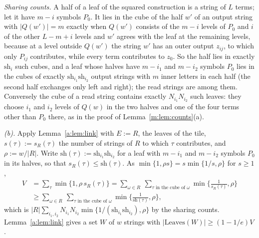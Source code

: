\documentclass[11pt]{article}
\theoremstyle{definition}
\theoremstyle{remark}
\newcommand{\Leaves}{\mathrm{Leaves}}
\begin{document}
\emph{Sharing counts.} A half of a leaf of the squared construction is a string of $L$ terms; let it have $m-i$ symbols $P_0$. It lies in the cube of the half $w'$ of an output string with $|Q(w')|=m$ exactly when $Q(w')$ consists of the $m-i$ levels of $P_0$ and $i$ of the other $L-m+i$ levels and $w'$ agrees with the leaf at the remaining levels, because at a level outside $Q(w')$ the string $w'$ has an outer output $z_{ij}$, to which only $P_{ij}$ contributes, while every term contributes to $z_0$. So the half lies in exactly $\mathrm{sh}_i$ such cubes, and a leaf whose halves have $m-i_1$ and $m-i_2$ symbols $P_0$ lies in the cubes of exactly $\mathrm{sh}_{i_1}\mathrm{sh}_{i_2}$ output strings with $m$ inner letters in each half (the second half exchanges only left and right); the read strings are among them. Conversely the cube of a read string contains exactly $N_{i_1}N_{i_2}$ such leaves: they choose $i_1$ and $i_2$ levels of $Q(w)$ in the two halves and one of the four terms other than $P_0$ there, as in the proof of Lemma~\ref{m:lem:counts}(a).

\emph{(b).} Apply Lemma~\ref{a:lem:link} with $E:=R$, the leaves of the tile, $s(\tau):=s_R(\tau)$ the number of strings of $R$ to which $\tau$ contributes, and $\rho:=w/|R|$. Write $\mathrm{sh}(\tau):=\mathrm{sh}_{i_1}\mathrm{sh}_{i_2}$ for a leaf with $m-i_1$ and $m-i_2$ symbols $P_0$ in its halves, so that $s_R(\tau)\le\mathrm{sh}(\tau)$. As $\min\{1,\rho s\}=s\min\{1/s,\rho\}$ for $s\ge1$,
\begin{align*}
V&=\sum_\tau\min\{1,\rho\,s_R(\tau)\}=\sum_{\omega\in R}\ \sum_{\tau\text{ in the cube of }\omega}\min\Big\{\frac1{s_R(\tau)},\rho\Big\}\\
&\ge\sum_{\omega\in R}\ \sum_{\tau\text{ in the cube of }\omega}\min\Big\{\frac1{\mathrm{sh}(\tau)},\rho\Big\},
\end{align*}
which is $|R|\sum_{i_1,i_2}N_{i_1}N_{i_2}\min\{1/(\mathrm{sh}_{i_1}\mathrm{sh}_{i_2}),\rho\}$ by the sharing counts. Lemma~\ref{a:lem:link} gives a set $W$ of $w$ strings with $|\Leaves(W)|\ge(1-1/e)V$.
\end{document}
